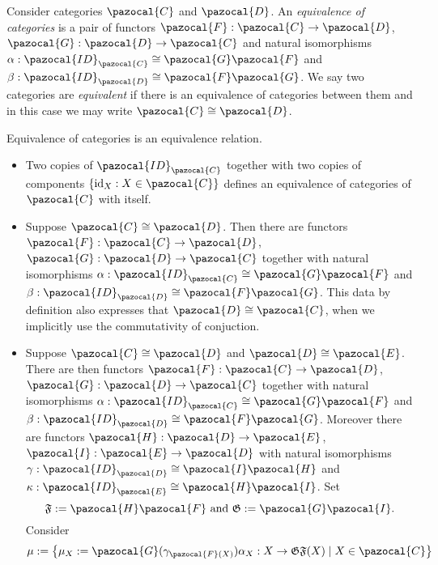     \begin{definition}
        Consider categories $\pazocal{C}$ and $\pazocal{D}$. An \emph{equivalence of categories} is a pair of functors $\pazocal{F}: \pazocal{C}\rightarrow \pazocal{D}$, $\pazocal{G}:\pazocal{D}\rightarrow \pazocal{C}$ and natural isomorphisms $\alpha : \pazocal{ID}_\pazocal{C} \cong \pazocal{G}\pazocal{F}$ and $\beta: \pazocal{ID}_\pazocal{D} \cong \pazocal{F}\pazocal{G}$. We say two categories are \emph{equivalent} if there is an equivalence of categories between them and in this case we may write $\pazocal{C}\cong \pazocal{D}$. 
    \end{definition}
    \begin{remark}
        Equivalence of categories is an equivalence relation. 
        \begin{itemize}
            \item Two copies of $\pazocal{ID}_\pazocal{C}$ together with two copies of components $\{\id_X : X\in \pazocal{C}\}$ defines an equivalence of categories of $\pazocal{C}$ with itself.
            \item Suppose $\pazocal{C}\cong \pazocal{D}$. Then there are functors $\pazocal{F}: \pazocal{C}\rightarrow \pazocal{D}$, $\pazocal{G}: \pazocal{D}\rightarrow \pazocal{C}$ together with natural isomorphisms $\alpha: \pazocal{ID}_\pazocal{C}\cong \pazocal{G}\pazocal{F}$ and $\beta:\pazocal{ID}_\pazocal{D}\cong \pazocal{F}\pazocal{G}$. This data by definition also expresses that $\pazocal{D}\cong \pazocal{C}$, when we implicitly use the commutativity of conjuction. 
            \item Suppose $\pazocal{C}\cong \pazocal{D}$ and $\pazocal{D}\cong \pazocal{E}$. There are then functors  $\pazocal{F}: \pazocal{C}\rightarrow \pazocal{D}$, $\pazocal{G}: \pazocal{D}\rightarrow \pazocal{C}$ together with natural isomorphisms $\alpha: \pazocal{ID}_\pazocal{C}\cong \pazocal{G}\pazocal{F}$ and $\beta:\pazocal{ID}_\pazocal{D}\cong \pazocal{F}\pazocal{G}$. Moreover there are functors $\pazocal{H} : \pazocal{D}\rightarrow\pazocal{E}$, $\pazocal{I}: \pazocal{E}\rightarrow \pazocal{D}$ with natural isomorphisms $\gamma : \pazocal{ID}_{\pazocal{D}} \cong \pazocal{I}\pazocal{H}$ and $\kappa : \pazocal{ID}_\pazocal{E} \cong \pazocal{H}\pazocal{I}$. Set 
            $$
                \mathfrak{F} := \pazocal{H}\pazocal{F} \text{ and } \mathfrak{G} := \pazocal{G}\pazocal{I}.
            $$
            Consider
            $$
                \mu := \left\{\mu_X:=\pazocal{G}(\gamma_{\pazocal{F}(X)})\alpha_X : X\rightarrow \mathfrak{GF}(X) \mid X\in \pazocal{C}\right\}
$$
\end{itemize}
\end{remark}
